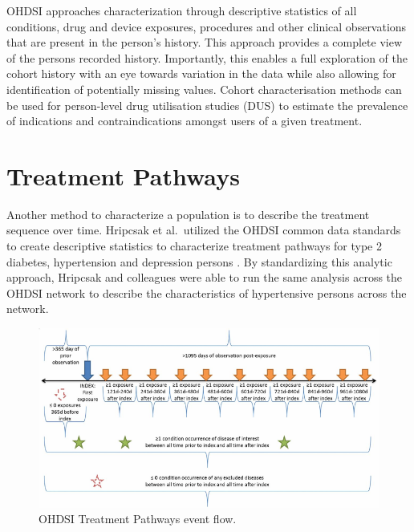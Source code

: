 \documentclass[11pt]{book}
\theoremstyle{definition}
\theoremstyle{definition}
\theoremstyle{definition}
\theoremstyle{remark}
\begin{document}
OHDSI approaches characterization through descriptive statistics of all conditions, drug and device exposures, procedures and other clinical observations that are present in the person's history. This approach provides a complete view of the persons recorded history. Importantly, this enables a full exploration of the cohort history with an eye towards variation in the data while also allowing for identification of potentially missing values. Cohort characterisation methods can be used for person-level drug utilisation studies (DUS) to estimate the prevalence of indications and contraindications amongst users of a given treatment.

\hypertarget{treatment-pathways}{%
\section{Treatment Pathways}\label{treatment-pathways}}

Another method to characterize a population is to describe the treatment sequence over time. Hripcsak et al.~utilized the OHDSI common data standards to create descriptive statistics to characterize treatment pathways for type 2 diabetes, hypertension and depression persons \citep{Hripcsak7329}. By standardizing this analytic approach, Hripcsak and colleagues were able to run the same analysis across the OHDSI network to describe the characteristics of hypertensive persons across the network.

\begin{figure}

{\centering \includegraphics[width=1\linewidth]{images/Characterization/pnasTreatmentPathwaysTimeline} 

}

\caption{OHDSI Treatment Pathways event flow.}\label{fig:treatmentPathwaysEventFlow}
\end{figure}
\end{document}
